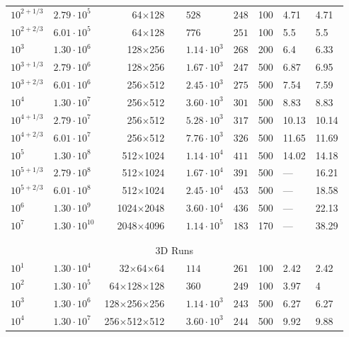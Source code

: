 \documentclass[aps, pre, onecolumn, nofootinbib, notitlepage, groupedaddress, amsfonts, amssymb, amsmath, longbibliography]{revtex4-1}
\begin{document}
\begin{table}
\begin{center}
\begin{tabularx}{\textwidth}{ X X r | X X X | X X }
$10^{2 + 1/3}$	&	$2.79 \cdot 10^5$       &	64$\times$128$\,\,\,\,\,\,\,$&	$528$	&	$248$	&	100	&	4.71	&	4.71	\\
$10^{2 + 2/3}$	&	$6.01 \cdot 10^5$       &	64$\times$128$\,\,\,\,\,\,\,$&	$776$	&	$251$	&	100	&	5.5	&	5.5	\\
$10^3$	        &	$1.30 \cdot 10^6$       &	128$\times$256$\,\,\,\,\,\,\,$&	$1.14 \cdot 10^3$	&	$268$	&	200	&	6.4	&	6.33	\\
$10^{3 + 1/3}$	&	$2.79 \cdot 10^6$       &	128$\times$256$\,\,\,\,\,\,\,$&	$1.67 \cdot 10^3$	&	$247$	&	500	&	6.87	&	6.95	\\
$10^{3 + 2/3}$	&	$6.01 \cdot 10^6$       &	256$\times$512$\,\,\,\,\,\,\,$&	$2.45 \cdot 10^3$	&	$275$	&	500	&	7.54	&	7.59	\\
$10^4$	        &	$1.30 \cdot 10^7$       &	256$\times$512$\,\,\,\,\,\,\,$&	$3.60 \cdot 10^3$	&	$301$	&	500	&	8.83	&	8.83	\\
$10^{4 + 1/3}$	&	$2.79 \cdot 10^7$       &	256$\times$512$\,\,\,\,\,\,\,$&	$5.28 \cdot 10^3$	&	$317$	&	500	&	10.13	&	10.14	\\
$10^{4 + 2/3}$	&	$6.01 \cdot 10^7$       &	256$\times$512$\,\,\,\,\,\,\,$&	$7.76 \cdot 10^3$	&	$326$	&	500	&	11.65	&	11.69	\\
$10^5$	        &	$1.30 \cdot 10^8$       &	512$\times$1024$\,\,\,\,\,\,\,$&	$1.14 \cdot 10^4$	&	$411$	&	500	&	14.02	&	14.18	\\
$10^{5 + 1/3}$	&	$2.79 \cdot 10^8$       &	512$\times$1024$\,\,\,\,\,\,\,$&	$1.67 \cdot 10^4$	&	$391$	&	500	&	---	&	16.21	\\
$10^{5 + 2/3}$	&	$6.01 \cdot 10^8$       &	512$\times$1024$\,\,\,\,\,\,\,$&	$2.45 \cdot 10^4$	&	$453$	&	500	&	---	&	18.58	\\
$10^6$	        &	$1.30 \cdot 10^9$       &	1024$\times$2048$\,\,\,\,\,\,\,$	&	$3.60 \cdot 10^4$	&	$436$	&	500	&	---	&	22.13	\\
$10^7$	        &	$1.30 \cdot 10^{10}$	&	2048$\times$4096$\,\,\,\,\,\,\,$	&	$1.14 \cdot 10^5$	&	$183$	&	170	&	---	&	38.29	\\
\\ \hline \hline \multicolumn{8}{c}{\vspace{-0.2cm}}\\
\multicolumn{8}{c}{\vspace{0.1cm}3D Runs} \\
\hline
$10^1$          &	$1.30 \cdot 10^4$	&	32$\times$64$\times$64$\,\,\,\,\,\,\,$   &	$114$	&	$261$	&	100	&	2.42	&	2.42	\\
$10^2$          &	$1.30 \cdot 10^5$	&	64$\times$128$\times$128$\,\,\,\,\,\,\,$   &	$360$	&	$249$	&	100	&	3.97	&	4	\\
$10^3$          &	$1.30 \cdot 10^6$	&	128$\times$256$\times$256$\,\,\,\,\,\,\,$	&	$1.14 \cdot 10^3$	&	$243$	&	500	&	6.27	&	6.27	\\
$10^4$          &	$1.30 \cdot 10^7$	&	256$\times$512$\times$512$\,\,\,\,\,\,\,$	&	$3.60 \cdot 10^3$	&	$244$	&	500	&	9.92	&	9.88	\\
\hline																	
\end{tabularx}
\end{center}
\end{table}
\end{document}
